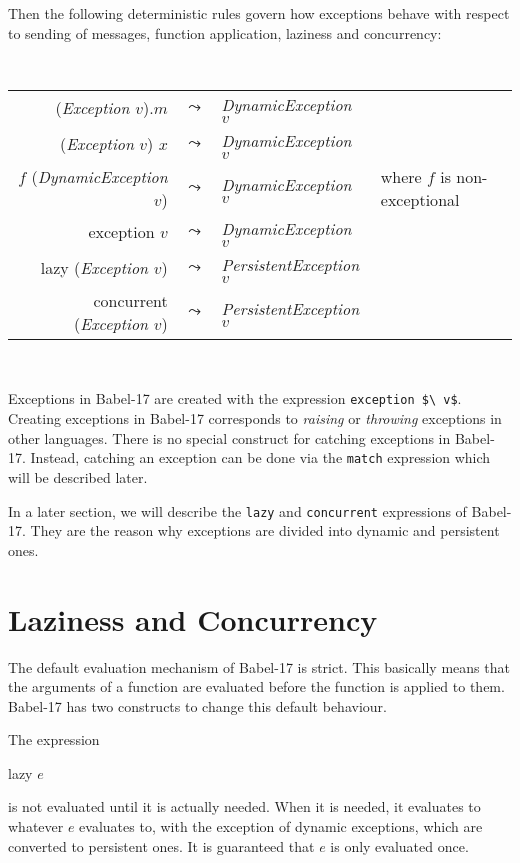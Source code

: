 \documentclass[11pt]{amsart}
\newcommand{\metababel}[1] {\textsl{#1}}
\newenvironment{babelcode}[0]{\begin{center}\tt}{\end{center}}
\newcommand{\babelsrc}[1] {\lstinline!#1!}
\begin{document}
Then the following deterministic rules govern how exceptions behave with respect to sending of messages, function application, laziness and concurrency:
\begin{babelcode}
\begin{tabular}{rcll}
(\metababel{Exception $v$}).$m$ & $\leadsto$ & \metababel{DynamicException $v$}&\\
(\textsl{Exception} $v$) $x$ & $\leadsto$ & \metababel{DynamicException $v$}&\\
$f$ (\metababel{DynamicException $v$}) & $\leadsto$ & \metababel{DynamicException $v$}& {\rm where $f$ is non-exceptional}\\
exception $v$ & $\leadsto$ & \metababel{DynamicException $v$}&\\
lazy (\metababel{Exception $v$}) & $\leadsto$ & \metababel{PersistentException $v$}&\\
concurrent (\metababel{Exception $v$}) & $\leadsto$ & \metababel{PersistentException $v$}&\\
\end{tabular}\\
\end{babelcode}
Exceptions in Babel-17 are created with the expression \babelsrc{exception $\ v$}. Creating exceptions in Babel-17 corresponds to \emph{raising} or \emph{throwing} exceptions in other languages. There is no special construct for catching exceptions in Babel-17. Instead, catching an exception can be done via the \babelsrc{match} expression which will be described later. 

In a later section, we will describe the  \babelsrc{lazy} and \babelsrc{concurrent} expressions of Babel-17. They are the reason why exceptions are divided into dynamic and persistent ones. 

\section{Laziness and Concurrency}
The default evaluation mechanism of Babel-17 is strict. This basically means that the arguments of a function are evaluated before the function is applied to them. Babel-17 has two constructs to change this default behaviour. 

The expression
\begin{babellisting}
lazy $e$
\end{babellisting}
is not evaluated until it is actually needed. When it is needed, it evaluates to whatever $e$ evaluates to, with the exception of dynamic exceptions, which are converted to persistent ones. It is guaranteed that $e$ is only evaluated once. 
\end{document}
